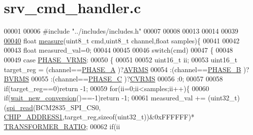 \hypertarget{a00042}{\section{srv\-\_\-cmd\-\_\-handler.\-c}
\label{d5/db6/a00042}
}

\begin{DoxyCode}
00001 
00006 \textcolor{preprocessor}{#include "../includes/includes.h"}
00007 
00008 
00013 
00014 
00039 
\hypertarget{a00042_source_l00040}{}\hyperlink{a00009_gac914ebaa64afce03ee852af09659cf69}{00040} \textcolor{keywordtype}{float} \hyperlink{a00009_gac914ebaa64afce03ee852af09659cf69}{measure}(uint8\_t cmd,uint8\_t channel,\textcolor{keywordtype}{float} samples)\{
00041 
00042 
00043     \textcolor{keywordtype}{float} measured\_val=0;
00044 
00045 
00046          \textcolor{keywordflow}{switch}(cmd)
00047         \{
00048            
00049                 \textcolor{keywordflow}{case}  \hyperlink{a00043_af0c09c5a455410e6fbd35fd55221338f}{PHASE\_VRMS}:
00050                 \{
00051                                 
00052                     uint16\_t ii;
00053                     uint16\_t target\_reg =  (channel==\hyperlink{a00043_ad214039f52b011ce2bd6c85ff98a981b}{PHASE\_A} )?\hyperlink{a00036_ae4c7fedd5702010e6907a686a35c1fa8}{AVRMS}
00054                                           :(channel==\hyperlink{a00043_ad7b96feed1e1c12515dad5e926b2c62e}{PHASE\_B} )?\hyperlink{a00036_a09f7027a92ccae6bb9b5738d5bc185f3}{BVRMS}
00055                                           :(channel==\hyperlink{a00043_a3ceb83fb10c2af19b468d508448f24e2}{PHASE\_C} )?\hyperlink{a00036_a61e9291ce0829a45cee1ee9a5f3ea4f7}{CVRMS}
00056                                           :0;                               
00057                     
00058                     \textcolor{keywordflow}{if}(target\_reg==0)\textcolor{keywordflow}{return} -1;                         
00059                     \textcolor{keywordflow}{for}(ii=0;ii<samples;ii++)\{
00060                     \textcolor{keywordflow}{if}(\hyperlink{a00003_ga7b6d584350762c53419945480d6958d3}{wait\_new\_conversion}()==-1)\textcolor{keywordflow}{return} -1;
00061                     measured\_val += (uint32\_t)(\hyperlink{a00007_ga7ad9f65ee46aca507374096506a0b1c4}{spi\_read}(BCM2835\_SPI\_CS0,
      \hyperlink{a00037_a94de2b046db6e10257ef4481c0a15eaa}{CHIP\_ADDRESS1},target\_reg,\textcolor{keyword}{sizeof}(uint32\_t))&0xFFFFFF)*
      \hyperlink{a00037_abcedc82a86b3c2ac9850cb7c6f5e7a9b}{TRANSFORMER\_RATIO}; 
00062                     \textcolor{keywordflow}{if}(ii%

\end{DoxyCode}
